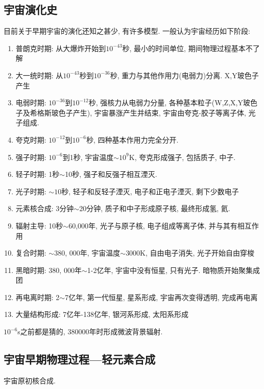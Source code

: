 \subsection{宇宙演化史}
目前关于早期宇宙的演化还知之甚少, 有许多模型. 一般认为宇宙经历如下阶段: 
\begin{enumerate}\small
    \item 普朗克时期: 从大爆炸开始到$10^{-43}$秒, 最小的时间单位, 期间物理过程基本不了解
    \item 大一统时期: 从$10^{-43}$秒到$10^{-36}$秒, 重力与其他作用力(电弱力)分离. X,Y玻色子产生
    \item 电弱时期: $10^{-36}$到$10^{-12}$秒, 强核力从电弱力分量, 各种基本粒子(W,Z,X,Y玻色子及希格斯玻色子产生), 宇宙暴涨产生并结束, 宇宙由夸克-胶子等离子体, 光子组成. 
    \item 夸克时期: $10^{-12}$到$10^{-6}$秒, 四种基本作用力完全分开. 
    \item 强子时期: $10^{-6}$到1秒, 宇宙温度$\sim10^9$K, 夸克形成强子, 包括质子, 中子. 
    \item 轻子时期: 1秒$\sim$10秒, 强子和反强子相互湮灭. 
    \item 光子时期: $\sim 10$秒, 轻子和反轻子湮灭, 电子和正电子湮灭, 剩下少数电子
    \item 元素核合成: 3分钟$\sim$20分钟, 质子和中子形成原子核, 最终形成氢, 氦. 
    \item 辐射主导:  10秒$\sim$60,000年, 光子与原子核, 电子组成等离子体, 并与其有相互作用
    \item 复合时期: $\sim$380, 000年, 宇宙温度$\sim$3000K, 自由电子消失, 光子开始自由穿梭
    \item 黑暗时期: 380, 000年$\sim$1-2亿年, 宇宙中没有恒星, 只有光子. 暗物质开始聚集成团
    \item 再电离时期: 2$\sim$7亿年, 第一代恒星, 星系形成, 宇宙再次变得透明, 完成再电离
    \item 大量结构形成: 7亿年-138亿年, 银河系形成, 太阳系形成
\end{enumerate}
$10^{-6}$s之前都是猜的, 380000年时形成微波背景辐射. 


\subsection{宇宙早期物理过程---轻元素合成}
宇宙原初核合成.

